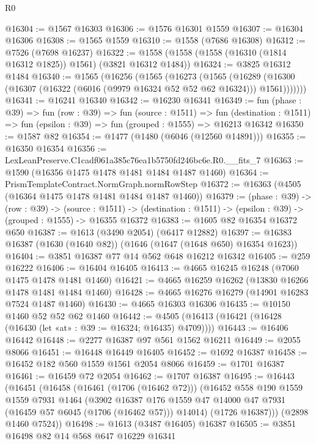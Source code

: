 \begin{lexlean}{R0}
\begin{coremodule}
@16304 := @1567 @16303
@16306 := @1576 @16301 @1559
@16307 := @16304 @16306
@16308 := @1565 @1559
@16310 := @1558 (@7686 @16308)
@16312 := @7526 (@7698 @16237)
@16322 := @1558 (@1558 (@1558 (@16310 (@1814 @16312 @1825)) @1561) (@3821 @16312 @1484))
@16324 := @3825 @16312 @1484
@16340 := @1565
    (@16256
      (@1565
        (@16273
          (@1565
            (@16289 (@16300 (@16307 (@16322 (@6016 (@9979 @16324 @52 @52 @62 @16324))) @1561)))))))
@16341 := @16241 @16340
@16342 := @16230 @16341
@16349 := fun (phase : @39) =>
  fun (row : @39) =>
  fun (source : @1511) =>
  fun (destination : @1511) => fun (epsilon : @39) => fun (grouped : @1555) => @16213 @16342
@16350 := @1587 @82
@16354 := @1477 (@1480 (@6046 (@12560 @14891)))
@16355 := @16350 @16354
@16356 := LexLeanPreserve.C1cadf061a385c76ea1b5750fd246bc6e.R0.__fits_7
@16363 := @1590 (@16356 @1475 @1478 @1481 @1484 @1487 @1460)
@16364 := PrismTemplateContract.NormGraph.normRowStep
@16372 := @16363 (@4505 (@16364 @1475 @1478 @1481 @1484 @1487 @1460))
@16379 := (phase : @39) ->
  (row : @39) ->
  (source : @1511) -> (destination : @1511) -> (epsilon : @39) -> (grouped : @1555) -> @16355 @16372
@16383 := @1605 @82 @16354 @16372 @650
@16387 := @1613 (@3490 @2054) (@6417 @12882)
@16397 := @16383 @16387 (@1630 (@1640 @82)) (@1646 (@1647 (@1648 @650) @16354 @1623))
@16404 := @3851 @16387 @77 @14 @562 @648 @16212 @16342
@16405 := @259 @16222
@16406 := @16404 @16405
@16413 := @4665 @16245 @16248 (@7060 @1475 @1478 @1481 @1460)
@16421 := @4665 @16259 @16262 (@13830 @16266 @1478 @1481 @1484 @1460)
@16428 := @4665 @16276 @16279 (@14901 @16283 @7524 @1487 @1460)
@16430 := @4665 @16303 @16306
@16435 := @10150 @1460 @52 @52 @62 @1460
@16442 := @4505 (@16413 (@16421 (@16428 (@16430 (let «at» : @39 := @16324; @16435) @4709))))
@16443 := @16406 @16442
@16448 := @2277 @16387 @97 @561 @1562 @16211
@16449 := @2055 @8066
@16451 := @16448 @16449 @16405
@16452 := @1692 @16387
@16458 := @16452 @182 @560 @1559 @1561 @2054 @8066
@16459 := @1701 @16387
@16461 := @16459 @72 @2054
@16462 := @1707 @16387
@16495 := @16443
    (@16451
      (@16458
        (@16461 (@1706 (@16462 @72)))
        (@16452
          @558
          @190
          @1559
          @1559
          @7931
          @1464
          (@3902
            @16387
            @176
            @1559
            @47
            @14000
            @47
            @7931
            (@16459 @57 @6045 (@1706 (@16462 @57)))
            @14014)
          (@1726 @16387)))
      (@2898 @1460 @7524))
@16498 := @1613 (@3487 @16405) @16387
@16505 := @3851 @16498 @82 @14 @568 @647 @16229 @16341

\end{coremodule}
\end{lexlean}
